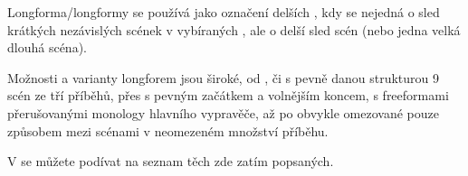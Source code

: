 \needspace{5cm} \label{longforma} Longforma/longformy se používá jako označení delších , kdy se nejedná 
o sled krátkých nezávislých scének v  vybíraných ,  
ale o delší sled scén (nebo jedna velká dlouhá scéna). 
 
Možnosti  a varianty longforem jsou široké, od , či  s pevně danou strukturou 9 scén ze tří příběhů, 
přes  s pevným začátkem a volnějším koncem,   s freeformami přerušovanými monology hlavního vypravěče,   
až po  obvykle omezované pouze způsobem  mezi scénami v neomezeném množství příběhu. 
 
V  se můžete podívat na seznam těch  zde zatím popsaných. 
 
 
